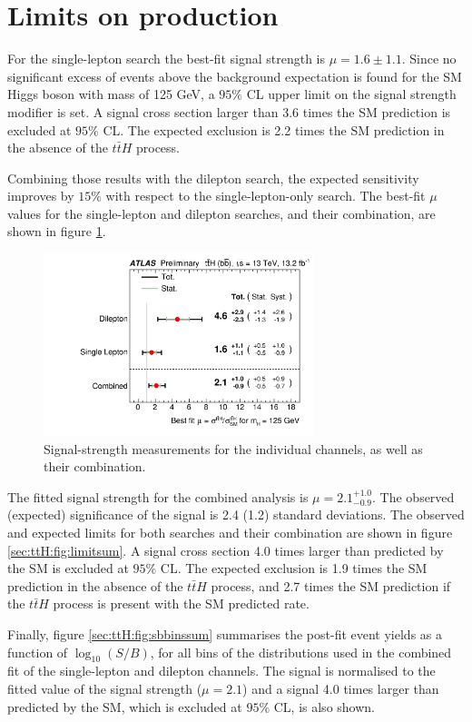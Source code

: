 \section[Limits on $t\bar{t}H$ production]{Limits on  production}

For the single-lepton search the best-fit signal strength is $\mu=1.6\pm1.1$. Since no significant excess of events above the background expectation is found for the SM Higgs boson with mass of 125 GeV, a $95\%$ CL upper limit on the signal strength modifier is set. A signal cross section larger than 3.6 times the SM prediction is excluded at $95\%$ CL. The expected exclusion is 2.2 times the SM prediction in the absence of the $t\bar{t}H$ process.\par
Combining those results with the dilepton search, the expected sensitivity improves by $15\%$ with respect to the single-lepton-only search.
The best-fit $\mu$ values for the single-lepton and dilepton searches, and their combination, are shown in figure \ref{sec:ttH:fig:musum}.
\begin{figure}[h!]
 \centering
 \includegraphics[width=0.7\textwidth]{figures/ttH/fig_13.png}
\captionsetup{width=0.85\textwidth}  \caption{\small Signal-strength measurements for the individual channels, as well as their combination.}
\label{sec:ttH:fig:musum}
\end{figure}
The fitted signal strength for the combined analysis is $\mu = 2.1^{+1.0}_{-0.9}$. The observed (expected) significance of the signal is 2.4 (1.2) standard deviations. The observed and expected limits for both searches and their combination are shown in figure \ref{sec:ttH:fig:limitsum}. A signal cross section 4.0 times larger than predicted by the SM is excluded at $95\%$ CL. The expected exclusion is 1.9 times the SM prediction in the absence of the $t\bar{t}H$ process, and 2.7 times the SM prediction if the $t\bar{t}H$ process is present with the SM predicted rate.\par
Finally, figure \ref{sec:ttH:fig:sbbinssum} summarises the post-fit event yields as a function of $\log_{10}(S/B)$, for all bins of the distributions used in the combined fit of the single-lepton and dilepton channels. The signal is normalised to the fitted value of the signal strength ($\mu = 2.1$) and a signal 4.0 times larger than predicted by the SM, which is excluded at $95\%$ CL, is also shown.

